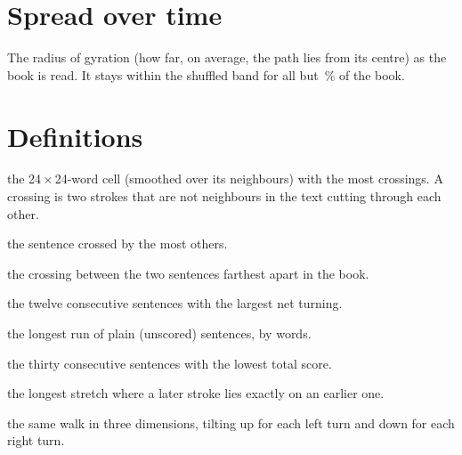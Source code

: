 \section{Spread over time}
\begin{center}
\end{center}
\noindent The radius of gyration (how far, on average, the path lies from its
centre) as the book is read. It stays within the shuffled band for all but
\,\% of the book.

\section{Definitions}
\begin{description}\small
\item[Knot] the 24\,$\times$\,24-word cell (smoothed over its neighbours) with
the most crossings. A crossing is two strokes that are not neighbours in the
text cutting through each other.
\item[Hub] the sentence crossed by the most others.
\item[Return] the crossing between the two sentences farthest apart in the book.
\item[Coil] the twelve consecutive sentences with the largest net turning.
\item[Corridor] the longest run of plain (unscored) sentences, by words.
\item[Darkest passage] the thirty consecutive sentences with the lowest total score.
\item[Palimpsest] the longest stretch where a later stroke lies exactly on an
earlier one.
\item[Mineshaft] the same walk in three dimensions, tilting \textdegree{}
up for each left turn and down for each right turn.
\end{description}
